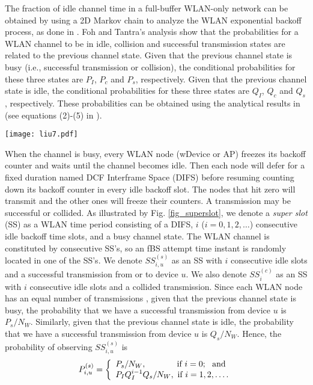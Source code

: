 \documentclass[journal,final,letterpaper,10pt,doublecolumn,twoside]{IEEEtran}
\begin{document}
The fraction of idle channel time in a full-buffer WLAN-only network
can be obtained by using a 2D Markov chain to analyze the WLAN
exponential backoff process, as done in
\cite{Bianchi,WiFi_modeling_Foh_freezingCounter,WiFi_analysis_freezingCounter_Lee2005Conf}.
Foh and Tantra's analysis \cite{WiFi_modeling_Foh_freezingCounter}
show that the probabilities for a WLAN channel to be in idle,
collision and successful transmission states are related to the
previous channel state. Given that the previous channel state is
busy (i.e., successful transmission or collision), the conditional
probabilities for these three states are $P_I$, $P_c$ and $P_s$,
respectively. Given that the previous channel state is  idle, the
conditional probabilities for these three states are $Q_I$, $Q_c$
and $Q_s$, respectively. These probabilities can be obtained using
the analytical results in \cite{WiFi_modeling_Foh_freezingCounter}
(see equations (2)-(5) in \cite{WiFi_modeling_Foh_freezingCounter}).






\begin{figure*}
  \center
  \texttt{[image: liu7.pdf]}
  \caption{WLAN channel can be viewed as consisting of consecutive super slots.} \label{fig_superslot}
\end{figure*}



When the channel is busy, every WLAN node (wDevice or AP) freezes
its backoff counter and waits until the channel becomes idle. Then
each node will defer for a fixed duration named DCF Interframe
Space (DIFS) before resuming counting down its backoff counter in
every idle backoff slot.  The nodes that hit zero will transmit and
the other ones will freeze their counters. A transmission may be
successful or collided. As illustrated by Fig. \ref{fig_superslot},
we denote a \emph{super slot} (SS) as a WLAN time period consisting
of a DIFS,  $i$ ($i = 0, 1, 2, \dots$) consecutive idle backoff time
slots, and a busy channel state. The WLAN channel is constituted by
consecutive SS's, so an fBS attempt time instant is randomly located
in one of the SS's. We denote $SS^{(s)}_{i,u}$ as an SS with $i$
consecutive idle slots and a successful transmission from or to device
$u$. We also denote $SS^{(c)}_{i}$ as an SS with $i$ consecutive idle
slots and a collided transmission. Since each WLAN node has an equal
number of transmissions \cite{equal_access_measure_infocom2003},
given that the previous channel state is busy, the probability that
we have a successful transmission from device $u$ is $P_s/N_W$.
Similarly, given that the previous channel state is idle, the
probability that we have a successful transmission from device $u$ is
$Q_s/N_W$. Hence, the probability of observing $SS^{(s)}_{i,u}$ is
\begin{eqnarray}
P^{(s)}_{i,u} =  \left\{ \begin{array}{l}
P_s / N_W, ~~~~~~~~~~~ \textmd{if}~ i=0; ~~ \textmd{and} \\
P_I Q_I^{i-1}Q_s / N_W, ~ \textmd{if}~ i=1, 2, \dots .
\end{array} \right .
\end{eqnarray}
\end{document}
